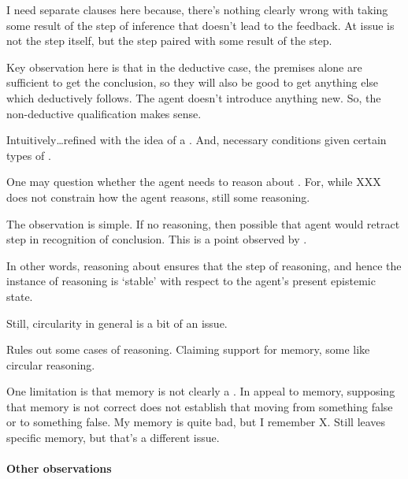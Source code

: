 \begin{note}
  {
    \color{red}
    I need separate clauses here because, there's nothing clearly wrong with taking some result of the step of inference that doesn't lead to the feedback.
    At issue is not the step itself, but the step paired with some result of the step.
  }

  {
    \color{red}
    Key observation here is that in the deductive case, the premises alone are sufficient to get the conclusion, so they will also be good to get anything else which deductively follows.
    The agent doesn't introduce anything new.
    So, the non-deductive qualification makes sense.
  }


  Intuitively\dots refined \ideaCSB{} with the idea of a \requ{}.
  And, necessary conditions given certain types of \requ{}.
\end{note}

\begin{note}
  One may question whether the agent needs to reason about .
  For, while {\color{red} XXX} does not constrain how the agent reasons, still some reasoning.

  The observation is simple.
  If no reasoning, then possible that agent would retract step in recognition of conclusion.
  This is a point observed by \citeauthor{Harman:1973ww}.

  In other words, reasoning about \crequ{} ensures that the step of reasoning, and hence the instance of reasoning is `stable' with respect to the agent's present epistemic state.
\end{note}

\hozline

\begin{note}
  Still, circularity in general is a bit of an issue.

  Rules out some cases of reasoning.
  Claiming support for memory, some like circular reasoning.

  One limitation is that memory is not clearly a \requ{}.
  In appeal to memory, supposing that memory is not correct does not establish that moving from something false or to something false.
  My memory is quite bad, but I remember X.
  Still leaves specific memory, but that's a different issue.
\end{note}


\paragraph{Other observations}

